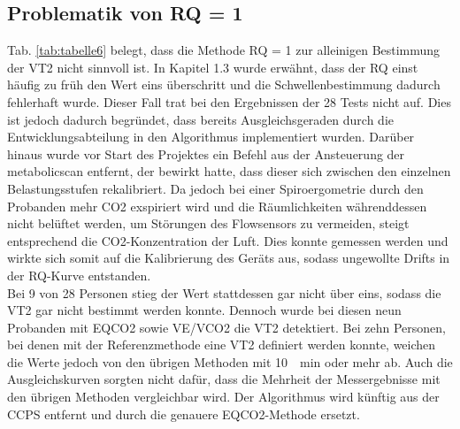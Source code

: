 \subsection{Problematik von RQ = 1}
%
Tab. \ref{tab:tabelle6} belegt, dass die Methode RQ = 1 zur alleinigen Bestimmung der VT2 nicht sinnvoll ist. In Kapitel 1.3 wurde erwähnt, dass der RQ einst häufig zu früh den Wert eins überschritt und die Schwellenbestimmung dadurch fehlerhaft wurde. Dieser Fall trat bei den Ergebnissen der 28 Tests nicht auf. Dies ist jedoch dadurch begründet, dass bereits Ausgleichsgeraden durch die Entwicklungsabteilung in den Algorithmus implementiert wurden. Darüber hinaus wurde vor Start des Projektes ein Befehl aus der Ansteuerung der metabolicscan entfernt, der bewirkt hatte, dass dieser sich zwischen den einzelnen Belastungsstufen rekalibriert. Da jedoch bei einer Spiroergometrie durch den Probanden mehr \acs{CO2} exspiriert wird und die Räumlichkeiten währenddessen nicht belüftet werden, um Störungen des Flowsensors zu vermeiden, steigt entsprechend die \acs{CO2}-Konzentration der Luft. Dies konnte gemessen werden und wirkte sich somit auf die Kalibrierung des Geräts aus, sodass ungewollte Drifts in der RQ-Kurve entstanden.\\
Bei 9 von 28 Personen stieg der Wert stattdessen gar nicht über eins, sodass die VT2 gar nicht bestimmt werden konnte. Dennoch wurde bei diesen neun Probanden mit \acs{EQCO2} sowie \acs{VE}/\acs{VCO2} die VT2 detektiert. Bei zehn Personen, bei denen mit der Referenzmethode eine VT2 definiert werden konnte, weichen die Werte jedoch von den übrigen Methoden mit \SI{10}{\per\minute} oder mehr ab. Auch die Ausgleichskurven sorgten nicht dafür, dass die Mehrheit der Messergebnisse mit den übrigen Methoden vergleichbar wird. Der Algorithmus wird künftig aus der \acs{CCPS} entfernt und durch die genauere \acs{EQCO2}-Methode ersetzt.
%
